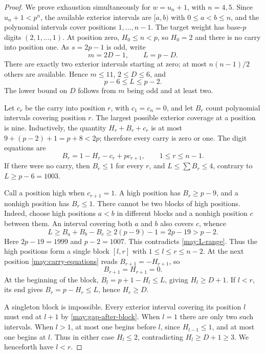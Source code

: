 \begin{proof}
We prove exhaustion simultaneously for $w=u_n+1$, with $n=4,5$.
Since $u_n+1<p^n$, the available exterior intervals are
$[a,b)$ with $0\leq a<b\leq n$, and the polynomial intervals cover
positions $1,\ldots,n-1$.  The target weight has base-$p$ digits
$(2,1,\ldots,1)$.  At position zero, $H_0\leq n<p$, so $H_0=2$ and
there is no carry into position one.  As $s=2p-1$ is odd, write
\[
 m=2D-1,\qquad L=p-D.
\]
There are exactly two exterior intervals starting at zero; at most
$n(n-1)/2$ others are available.  Hence $m\leq11$, $2\leq D\leq6$,
and
\begin{equation}
 p-6\leq L\leq p-2.
 \label{may:L-range}
\end{equation}
The lower bound on $D$ follows from $m$ being odd and at least two.

Let $c_r$ be the carry into position $r$, with $c_1=c_n=0$, and let
$B_r$ count polynomial intervals covering position $r$.  The largest
possible exterior coverage at a position is nine.  Inductively, the
quantity $H_r+B_r+c_r$ is at most $9+(p-2)+1=p+8<2p$;
therefore every carry is zero or one.  The digit equations are
\begin{equation}
 B_r=1-H_r-c_r+pc_{r+1},\qquad 1\leq r\leq n-1.
 \label{may:carry-equations}
\end{equation}
If there were no carry, then $B_r\leq1$ for every $r$, and
$L\leq\sum B_r\leq4$, contrary to $L\geq p-6=1003$.

Call a position high when $c_{r+1}=1$.  A high position has
$B_r\geq p-9$, and a nonhigh position has $B_r\leq1$.
There cannot be two blocks of high positions.  Indeed, choose high
positions $a<b$ in different blocks and a nonhigh position $c$ between
them.  An interval covering both $a$ and $b$ also covers $c$, whence
\[
 L\geq B_a+B_b-B_c\geq2(p-9)-1=2p-19>p-2.
\]
Here $2p-19=1999$ and $p-2=1007$.  This contradicts
\eqref{may:L-range}.  Thus the high positions form a single block
$[l,r]$ with $1\leq l\leq r\leq n-2$.
At the next position \eqref{may:carry-equations} reads
$B_{r+1}=-H_{r+1}$, so
\begin{equation}
 B_{r+1}=H_{r+1}=0.
 \label{may:gap-after-block}
\end{equation}
At the beginning of the block, $B_l=p+1-H_l\leq L$, giving
$H_l\geq D+1$.  If $l<r$, its end gives
$B_r=p-H_r\leq L$, hence $H_r\geq D$.

A singleton block is impossible.  Every exterior interval covering its
position $l$ must end at $l+1$ by \eqref{may:gap-after-block}.  When
$l=1$ there are only two such intervals.  When $l>1$, at most one begins
before $l$, since $H_{l-1}\leq1$, and at most one begins at $l$.
Thus in either case $H_l\leq2$, contradicting $H_l\geq D+1\geq3$.
We henceforth have $l<r$.


\end{proof}
